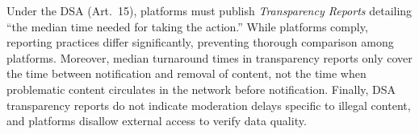 \documentclass{article}
\begin{document}
%
%
%

Under the DSA (Art.~15), platforms must publish \textit{Transparency Reports} detailing ``the median time needed for taking the action.'' While platforms comply, reporting practices differ significantly, preventing 
thorough comparison among platforms. 
Moreover, median turnaround times in transparency reports only cover the time between notification and removal of content, not the time when problematic content circulates in the network before notification.
Finally, DSA transparency reports do not indicate moderation delays specific to illegal content, and platforms disallow external access to verify data quality. 
\end{document}
